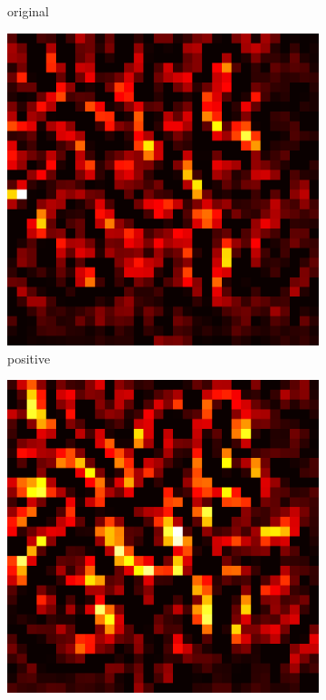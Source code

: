 \documentclass[preprint,12pt]{elsarticle}
\begin{document}
\begin{figure}
\begin{subfigure}{0.14\linewidth}
        \caption{original}
    \end{subfigure}
    \hfill
    \begin{subfigure}{0.14\textwidth}
        \centering
        \includegraphics[width=\linewidth]{../visualizations/examples/cifar10/resnet18/positive_saliency_map/3.png}
        \caption{positive}
    \end{subfigure}
    \hfill
    \begin{subfigure}{0.14\textwidth}
        \centering
        \includegraphics[width=\linewidth]{../visualizations/examples/cifar10/resnet18/negative_saliency_map/3.png}

\end{subfigure}
\end{figure}
\end{document}
